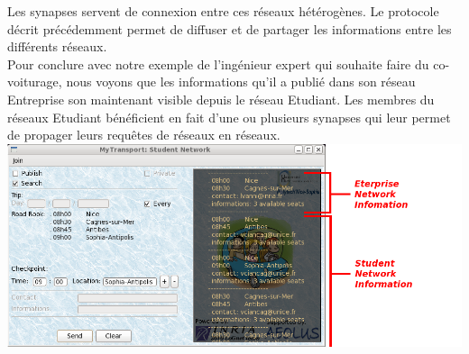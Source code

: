 Les synapses servent de connexion entre ces réseaux hétérogènes. Le protocole décrit précédemment permet de diffuser et de partager les informations entre les différents réseaux.\\

Pour conclure avec notre exemple de l'ingénieur expert qui souhaite faire du co-voiturage, nous voyons que les informations qu'il a publié dans son réseau Entreprise son maintenant visible depuis le réseau Etudiant. Les membres du réseaux Etudiant bénéficient en fait d'une ou plusieurs synapses qui leur permet de propager leurs requêtes de réseaux en réseaux. \\

\includegraphics[scale=0.55]{img/screenshot/NiceCagnesAntibesSophiaSub_StudentNetwork}\\

